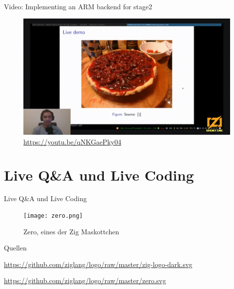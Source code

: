 \documentclass[aspectratio=169]{beamer}
\begin{document}
\begin{frame}{Video: Implementing an ARM backend for stage2}
  \begin{figure}
    \centering
    \includegraphics[height=0.8\textheight]{img/mpv-shot0001.jpg}
    \caption{\url{https://youtu.be/qNKGaePky04}}
    \label{fig:arm-backend}
  \end{figure}
\end{frame}

\section{Live Q\&A und Live Coding}

\begin{frame}{Live Q\&A und Live Coding}
  \begin{figure}
    \centering
    \texttt{[image: zero.png]}
    \caption{Zero, eines der Zig Maskottchen \cite{zero}}
    \label{fig:zero}
  \end{figure}
\end{frame}

\begin{frame}{Quellen}
  \begin{thebibliography}{}
    \url{https://github.com/ziglang/logo/raw/master/zig-logo-dark.svg}

    \url{https://github.com/ziglang/logo/raw/master/zero.svg}

  \end{thebibliography}
\end{frame}
\end{document}
